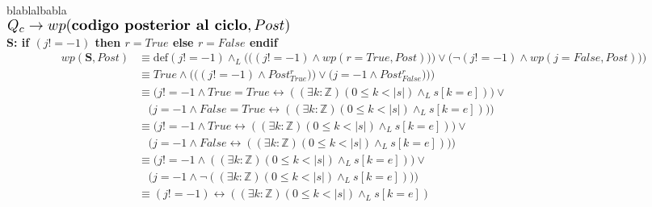 \documentclass[a4paper]{article}
\begin{document}
blablalbabla\medskip\\
$\scalebox{1.3}{$Q_c \rightarrow wp(\textbf{codigo posterior al ciclo},Post)$}$\medskip \\
\textbf{S: if $(j != -1)$ then $r=True$ else $r=False$ endif}\\
\begin{align*}
   			wp(\textbf{S},Post)&\equiv \textrm{def}(j != -1)\wedge_L 
   				\Bigg(\Big((j!=-1)\wedge wp(r=True,Post))\Big) \vee\Big(\neg (j!=-1)\wedge wp(j=False,Post)\Big)\Bigg)\\
   					&\equiv True \wedge \Bigg(\Big((j!=-1)\wedge Post_{True}^{r})\Big) 
   						\vee\Big(j=-1\wedge Post_{False}^{r})\Big)\Bigg)\\ 
   				&\equiv \Big(j!=-1\wedge True=True \leftrightarrow ((\exists k:\mathbb{Z})(0\leq k<|s|)\wedge_L s[k=e])\Big) \vee\\
   						&\ \ \ \ \Big(j=-1\wedge False=True \leftrightarrow ((\exists k:\mathbb{Z})(0\leq k<|s|)\wedge_L s[k=e]))\Big)\\ 
   				&\equiv \Big(j!=-1\wedge True \leftrightarrow ((\exists k:\mathbb{Z})(0\leq k<|s|)\wedge_L s[k=e])\Big) \vee\\
   						&\ \ \ \ \Big(j=-1\wedge False \leftrightarrow ((\exists k:\mathbb{Z})(0\leq k<|s|)\wedge_L s[k=e]))\Big)\\   
   				&\equiv \Big(j!=-1\wedge ((\exists k:\mathbb{Z})(0\leq k<|s|)\wedge_L s[k=e])\Big) \vee\\
   						&\ \ \ \ \Big(j=-1\wedge \neg((\exists k:\mathbb{Z})(0\leq k<|s|)\wedge_L s[k=e]))\Big)\\    	
   				&\equiv (j!=-1)\leftrightarrow ((\exists k:\mathbb{Z})(0\leq k<|s|)\wedge_L s[k=e])  						   				  		
   		\end{align*}
\end{document}
